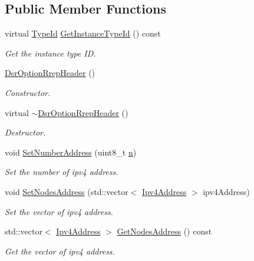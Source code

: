 \subsection*{Public Member Functions}
\begin{DoxyCompactItemize}
\item 
virtual \hyperlink{classns3_1_1TypeId}{Type\+Id} \hyperlink{classns3_1_1dsr_1_1DsrOptionRrepHeader_a7d3c520ac2c655993d3d134f509ecb27}{Get\+Instance\+Type\+Id} () const 
\begin{DoxyCompactList}\small\item\em Get the instance type ID. \end{DoxyCompactList}\item 
\hyperlink{classns3_1_1dsr_1_1DsrOptionRrepHeader_a1ba77de0c947d0bd939061c5d5cdf8ac}{Dsr\+Option\+Rrep\+Header} ()
\begin{DoxyCompactList}\small\item\em Constructor. \end{DoxyCompactList}\item 
virtual \hyperlink{classns3_1_1dsr_1_1DsrOptionRrepHeader_a737c8e50a660371d0bb185a9afc99421}{$\sim$\+Dsr\+Option\+Rrep\+Header} ()
\begin{DoxyCompactList}\small\item\em Destructor. \end{DoxyCompactList}\item 
void \hyperlink{classns3_1_1dsr_1_1DsrOptionRrepHeader_a3b8e4f3e366a1e43e08c386a38c258d2}{Set\+Number\+Address} (uint8\+\_\+t \hyperlink{lte__link__budget__x2__handover__measures_8m_abdb05bc5a064cf642a06c83b3392f148}{n})
\begin{DoxyCompactList}\small\item\em Set the number of ipv4 address. \end{DoxyCompactList}\item 
void \hyperlink{classns3_1_1dsr_1_1DsrOptionRrepHeader_a95a87c4628c000eaa4c1f375f0fe5f8d}{Set\+Nodes\+Address} (std\+::vector$<$ \hyperlink{classns3_1_1Ipv4Address}{Ipv4\+Address} $>$ ipv4\+Address)
\begin{DoxyCompactList}\small\item\em Set the vector of ipv4 address. \end{DoxyCompactList}\item 
std\+::vector$<$ \hyperlink{classns3_1_1Ipv4Address}{Ipv4\+Address} $>$ \hyperlink{classns3_1_1dsr_1_1DsrOptionRrepHeader_a476467fcd4e43cf2b858beb83bed9fcf}{Get\+Nodes\+Address} () const 
\begin{DoxyCompactList}\small\item\em Get the vector of ipv4 address. \end{DoxyCompactList}\item 

\end{DoxyCompactItemize}
